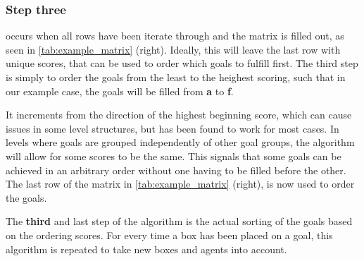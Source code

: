 \subsubsection{Step three} occurs when all rows have been iterate through and the matrix is filled out, as seen in \cref{tab:example_matrix} (right). Ideally, this will leave the last row with unique scores, that can be used to order which goals to fulfill first. The third step is simply to order the goals from the least to the heighest scoring, such that in our example case, the goals will be filled from \textbf{a} to \textbf{f}.

It increments from the direction of the highest beginning score, which can cause issues in some level structures, but has been found to work for most cases.
In levels where goals are grouped independently of other goal groups, the algorithm will allow for some scores to be the same.
This signals that some goals can be achieved in an arbitrary order without one having to be filled before the other. 
The last row of the matrix in \cref{tab:example_matrix} (right), is now used to order the goals. 


The \textbf{third} and last step of the algorithm is the actual sorting of the goals based on the ordering scores. 
For every time a box has been placed on a goal, this algorithm is repeated to take new boxes and agents into account. 





